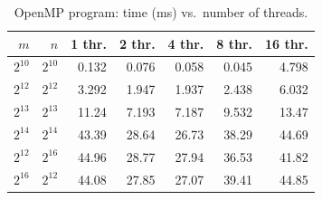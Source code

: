 \begin{table}[H]\centering\small
\caption{OpenMP program: time (ms) vs.\ number of threads.}\label{tab:q2omp}
\begin{tabular}{rrrrrrr}
\toprule
$m$ & $n$ & 1 thr. & 2 thr. & 4 thr. & 8 thr. & 16 thr. \\
\midrule
$2^{10}$ & $2^{10}$ & 0.132 & 0.076 & 0.058 & 0.045 & 4.798 \\
$2^{12}$ & $2^{12}$ & 3.292 & 1.947 & 1.937 & 2.438 & 6.032 \\
$2^{13}$ & $2^{13}$ & 11.24 & 7.193 & 7.187 & 9.532 & 13.47 \\
$2^{14}$ & $2^{14}$ & 43.39 & 28.64 & 26.73 & 38.29 & 44.69 \\
$2^{12}$ & $2^{16}$ & 44.96 & 28.77 & 27.94 & 36.53 & 41.82 \\
$2^{16}$ & $2^{12}$ & 44.08 & 27.85 & 27.07 & 39.41 & 44.85 \\
\bottomrule
\end{tabular}
\end{table}
